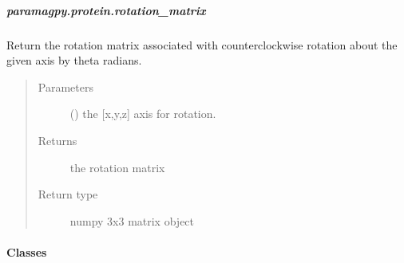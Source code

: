 \documentclass[a4paper,10pt,english,openany,oneside]{sphinxmanual}
\begin{document}
\subparagraph{paramagpy.protein.rotation\_matrix}
\label{\detokenize{reference/generated/paramagpy.protein.rotation_matrix:paramagpy-protein-rotation-matrix}}\label{\detokenize{reference/generated/paramagpy.protein.rotation_matrix::doc}}

\begin{fulllineitems}
\label{\detokenize{reference/generated/paramagpy.protein.rotation_matrix:paramagpy.protein.rotation_matrix}}
\sphinxAtStartPar
Return the rotation matrix associated with counterclockwise
rotation about the given axis by theta radians.
\begin{quote}\begin{description}
\item[{Parameters}] \leavevmode
\sphinxAtStartPar
{} () \textendash{} the {[}x,y,z{]} axis for rotation.

\item[{Returns}] \leavevmode
\sphinxAtStartPar
{} \textendash{} the rotation matrix

\item[{Return type}] \leavevmode
\sphinxAtStartPar
numpy 3x3 matrix object

\end{description}\end{quote}

\end{fulllineitems}



\paragraph{Classes}
\label{\detokenize{reference/protein:classes}}
\end{document}
